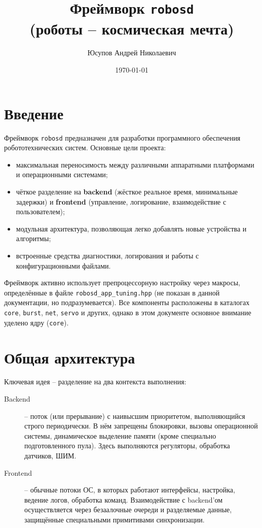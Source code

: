 \documentclass[a4paper,12pt]{article}
\title{Фреймворк \texttt{robosd} \\ (роботы -- космическая мечта)}
\author{Юсупов Андрей Николаевич}
\date{\today}
\begin{document}
\maketitle
\tableofcontents
\newpage

\section{Введение}

Фреймворк \texttt{robosd} предназначен для разработки программного обеспечения робототехнических систем. 
Основные цели проекта:
\begin{itemize}
    \item максимальная переносимость между различными аппаратными платформами и операционными системами;
    \item чёткое разделение на \textbf{backend} (жёсткое реальное время, минимальные задержки) и \textbf{frontend} (управление, логирование, взаимодействие с пользователем);
    \item модульная архитектура, позволяющая легко добавлять новые устройства и алгоритмы;
    \item встроенные средства диагностики, логирования и работы с конфигурационными файлами.
\end{itemize}

Фреймворк активно использует препроцессорную настройку через макросы, определённые в файле \texttt{robosd\_app\_tuning.hpp} (не показан в данной документации, но подразумевается). 
Все компоненты расположены в каталогах \texttt{core}, \texttt{burst}, \texttt{net}, \texttt{servo} и других, однако в этом документе основное внимание уделено ядру (\texttt{core}).

\section{Общая архитектура}

Ключевая идея -- разделение на два контекста выполнения:
\begin{description}
    \item[Backend] -- поток (или прерывание) с наивысшим приоритетом, выполняющийся строго периодически. В нём запрещены блокировки, вызовы операционной системы, динамическое выделение памяти (кроме специально подготовленного пула). Здесь выполняются регуляторы, обработка датчиков, ШИМ.
    \item[Frontend] -- обычные потоки ОС, в которых работают интерфейсы, настройка, ведение логов, обработка команд. Взаимодействие с backend'ом осуществляется через безаалочные очереди и разделяемые данные, защищённые специальными примитивами синхронизации.
\end{description}
\end{document}

